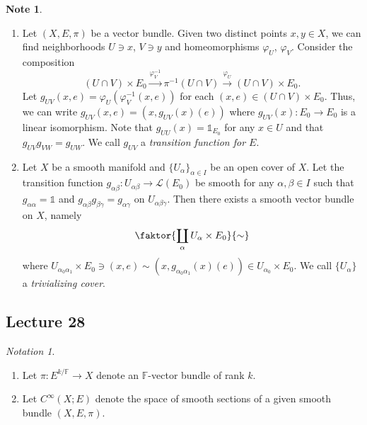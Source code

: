 \documentclass[10pt,letterpaper,cm]{nupset}
\theoremstyle{definition}
\newtheorem{note}[definition]{Note}
\theoremstyle{theorem}
\theoremstyle{remark}
\newtheorem*{notation}{Notation}
\newcommand{\F}{\mathbb F}
\newcommand{\1}{\mathbb{1}}
\newcommand{\0}{\vec 0}
\begin{document}
\begin{note} $ $
\begin{enumerate}
\item Let $(X, E, \pi)$ be a vector bundle. Given two distinct points $x,y \in X$, we can find neighborhoods $U\ni x$, $V\ni y$ and homeomorphisms $\varphi_U$, $\varphi_V$. Consider the composition $$ (U \cap V) \times E_0 \overset{\varphi^{-1}_V}{\longrightarrow} \pi^{-1}(U \cap V) \overset{\varphi_U}{\longrightarrow} (U \cap V) \times E_0    .$$ Let $g_{UV}(x,e) = \varphi_U(\varphi_V^{-1}(x,e))$ for each $(x,e) \in (U \cap V) \times E_0$. Thus, we can write $g_{UV}(x,e) = (x, g_{UV}(x)(e))$ where $g_{UV}(x) : E_0 \to E_0$ is a linear isomorphism. Note that $g_{UU}(x) = \1_{E_0}$ for any $x\in U$ and that $g_{UV}g_{VW} = g_{UW}$. We call $g_{UV}$ a \textit{transition function for $E$}.
\item Let $X$ be a smooth manifold and $\{U_{\alpha}\}_{\alpha \in I}$ be an open cover of $X$. Let the transition function $g_{\alpha{\beta}} : U_{\alpha{\beta}} \to \mathcal{L}(E_0)$ be smooth for any $\alpha, \beta \in I$ such that $g_{\alpha{\alpha}} = \1$ and $g_{\alpha{\beta}}g_{\beta{\gamma}} = g_{\alpha{\gamma}}$ on $U_{\alpha{\beta}{\gamma}}$. Then there exists a smooth vector bundle on $X$, namely $$  \faktor{\coprod_{\alpha}{U_{\alpha} \times E_0}}{\sim}    $$ where $ U_{\alpha_0{\alpha_1}} \times E_0 \ni (x,e) \sim (x, g_{\alpha_0{\alpha_1}}(x)(e)) \in U_{\alpha_0}\times E_0$. We call $\{U_{\alpha}\}$ a \textit{trivializing cover}.
\end{enumerate}
\end{note}

\subsection{Lecture 28}

\begin{notation} $ $
\begin{enumerate}
\item Let $\pi : E^{k/\F} \to X$ denote an $\F$-vector bundle of rank $k$. 
\item Let $C^{\infty}(X; E)$ denote the space of smooth sections of a given smooth bundle $(X, E, \pi)$.
\end{enumerate}
\end{notation}
\end{document}

